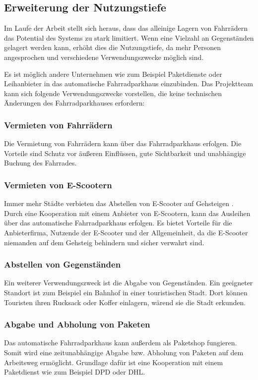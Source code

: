 \break
\subsection{Erweiterung der Nutzungstiefe}

Im Laufe der Arbeit stellt sich heraus, dass das alleinige Lagern von Fahrrädern das Potential des Systems zu stark limitiert. Wenn eine Vielzahl an Gegenständen gelagert werden kann, erhöht dies die Nutzungstiefe, da mehr Personen angesprochen und verschiedene Verwendungszwecke möglich sind.

\smallskip \noindent Es ist möglich andere Unternehmen wie zum Beispiel Paketdienste oder Leihanbieter in das automatische Fahrradparkhaus einzubinden.
\noindent Das Projektteam kann sich folgende Verwendungszwecke vorstellen, die keine technischen Änderungen des Fahrradparkhauses erfordern:

\subsubsection{Vermieten von Fahrrädern}
Die Vermietung von Fahrrädern kann über das Fahrradparkhaus erfolgen. Die Vorteile sind Schutz vor äußeren Einflüssen, gute Sichtbarkeit und unabhängige Buchung des Fahrrades.

\subsubsection{Vermieten von E-Scootern}
Immer mehr Städte verbieten das Abstellen von E-Scooter auf Gehsteigen . Durch eine Kooperation mit einem Anbieter von E-Scootern, kann das Ausleihen über das automatische Fahrradparkhaus erfolgen. Es bietet Vorteile für die Anbieterfirma, Nutzende der E-Scooter und der Allgemeinheit, da die E-Scooter niemanden auf dem Gehsteig behindern und sicher verwahrt sind.

\subsubsection{Abstellen von Gegenständen}
Ein weiterer Verwendungszweck ist die Abgabe von Gegenständen. Ein geeigneter Standort ist zum Beispiel ein Bahnhof in einer touristischen Stadt. Dort können Touristen ihren Rucksack oder Koffer einlagern, wärend sie die Stadt erkunden.

\subsubsection{Abgabe und Abholung von Paketen}
Das automatische Fahrradparkhaus kann außerdem als Paketshop fungieren. Somit wird eine zeitunabhängige Abgabe bzw. Abholung von Paketen auf dem Arbeitsweg ermöglicht. Grundlage dafür ist eine Kooperation mit einem Paketdienst wie zum Beispiel DPD oder DHL.

